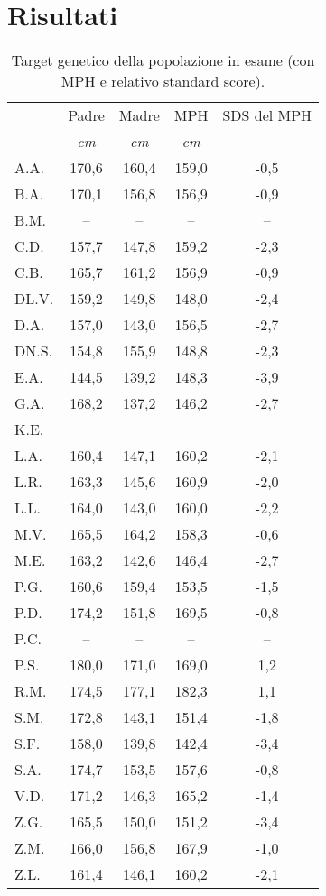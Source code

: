 \chapter{Risultati}

\begin{table}[!h]
\begin{center}
\addtolength{\tabcolsep}{12pt}
\renewcommand{\arraystretch}{1.1}
\begin{tabular}{lcccc}
\toprule

 & Padre & Madre & MPH & SDS del MPH \\
 & \emph{cm} & \emph{cm} & \emph{cm} & \\
\midrule
A.A.	& 170,6 & 160,4 & 159,0 & -0,5  \\
B.A.	& 170,1 & 156,8 & 156,9 & -0,9  \\
B.M.	& --    & --    & --    & --    \\
C.D.	& 157,7 & 147,8 & 159,2 & -2,3  \\
C.B.	& 165,7 & 161,2 & 156,9 & -0,9  \\
DL.V.	& 159,2 & 149,8 & 148,0 & -2,4  \\
D.A.	& 157,0 & 143,0 & 156,5 & -2,7  \\
DN.S.	& 154,8 & 155,9 & 148,8 & -2,3  \\
E.A.	& 144,5 & 139,2 & 148,3 & -3,9  \\
G.A.	& 168,2 & 137,2 & 146,2 & -2,7  \\
K.E.	&  &  &  &  \\            
L.A.	& 160,4 & 147,1 & 160,2 & -2,1  \\
L.R.	& 163,3 & 145,6 & 160,9 & -2,0  \\
L.L.	& 164,0 & 143,0 & 160,0 & -2,2  \\
M.V.	& 165,5 & 164,2 & 158,3 & -0,6  \\
M.E.	& 163,2 & 142,6 & 146,4 & -2,7  \\
P.G.	& 160,6 & 159,4 & 153,5 & -1,5  \\
P.D.	& 174,2 & 151,8 & 169,5 & -0,8  \\
P.C.	& --    & --    & --    & --    \\
P.S.	& 180,0 & 171,0 & 169,0 & 1,2   \\
R.M.	& 174,5 & 177,1 & 182,3 & 1,1   \\
S.M.	& 172,8 & 143,1 & 151,4 & -1,8  \\
S.F.	& 158,0 & 139,8 & 142,4 & -3,4  \\
S.A.	& 174,7 & 153,5 & 157,6 & -0,8  \\
V.D.	& 171,2 & 146,3 & 165,2 & -1,4  \\
Z.G.	& 165,5 & 150,0 & 151,2 & -3,4  \\
Z.M.	& 166,0 & 156,8 & 167,9 & -1,0  \\
Z.L.	& 161,4 & 146,1 & 160,2 & -2,1  \\
\bottomrule
\end{tabular}
\end{center}
\caption{Target genetico della popolazione in esame (con MPH e relativo standard score).}
\label{tab:TargetGenetici}
\end{table}

